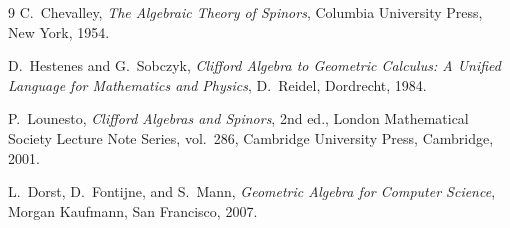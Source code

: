 \documentclass[11pt]{article}
\theoremstyle{plain}
\theoremstyle{definition}
\theoremstyle{remark}
\begin{document}
\begin{thebibliography}{9}
C.~Chevalley, \emph{The Algebraic Theory of Spinors}, Columbia University Press, New York, 1954.

D.~Hestenes and G.~Sobczyk, \emph{Clifford Algebra to Geometric Calculus: A Unified Language for Mathematics and Physics}, D.~Reidel, Dordrecht, 1984.

P.~Lounesto, \emph{Clifford Algebras and Spinors}, 2nd ed., London Mathematical Society Lecture Note Series, vol.~286, Cambridge University Press, Cambridge, 2001.

L.~Dorst, D.~Fontijne, and S.~Mann, \emph{Geometric Algebra for Computer Science}, Morgan Kaufmann, San Francisco, 2007.
\end{thebibliography}
\end{document}
